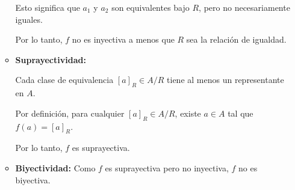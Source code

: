 \begin{solution}
\begin{enumerate}
\begin{itemize}
			            Esto significa que \( a_1 \) y \( a_2 \) son equivalentes bajo \( R \), pero no necesariamente iguales.

			            Por lo tanto, \( f \) no es inyectiva a menos que \( R \) sea la relación de igualdad.

			      \item \textbf{Suprayectividad:}

			            Cada clase de equivalencia \( [a]_R \in A/R \) tiene al menos un representante en \( A \).

			            Por definición, para cualquier \( [a]_R \in A/R \), existe \( a \in A \) tal que \( f(a) = [a]_R \).

			            Por lo tanto, \( f \) es suprayectiva.

			      \item \textbf{Biyectividad:} Como \( f \) es suprayectiva pero no inyectiva, \( f \) no es biyectiva.
		      \end{itemize}
	\end{enumerate}
\end{solution}